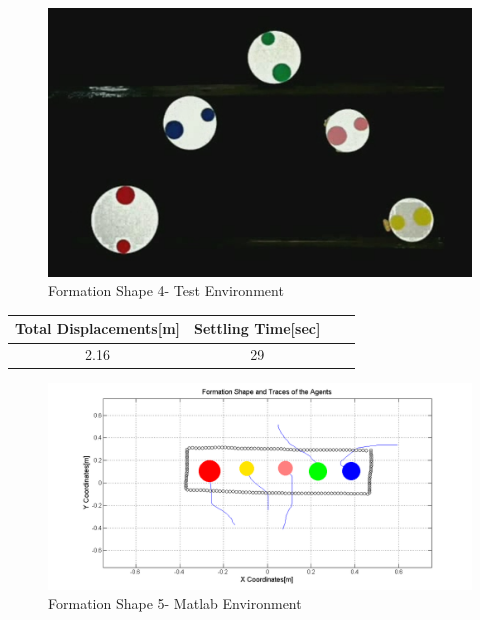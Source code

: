 \begin{figure}[H]
\caption{Formation Shape 4- Test Environment}
\centerline{\includegraphics[scale = 0.35]{6_real_hardware}}
\end{figure} 
					
\begin{center}
 \label{hardwareshape4_ref} 
\begin{tabular}{||c| c |c |c ||}
\hline
\textbf{Total Displacements[m]}  & \textbf{Settling Time[sec]}\\ 
\hline
2.16 & 29 \\
\hline
\end{tabular}
\end{center}
		
\begin{figure}[H]
\caption{Formation Shape 5- Matlab Environment}
\centerline{\includegraphics[scale = 0.45]{9_hardware}}
\end{figure} 
					

